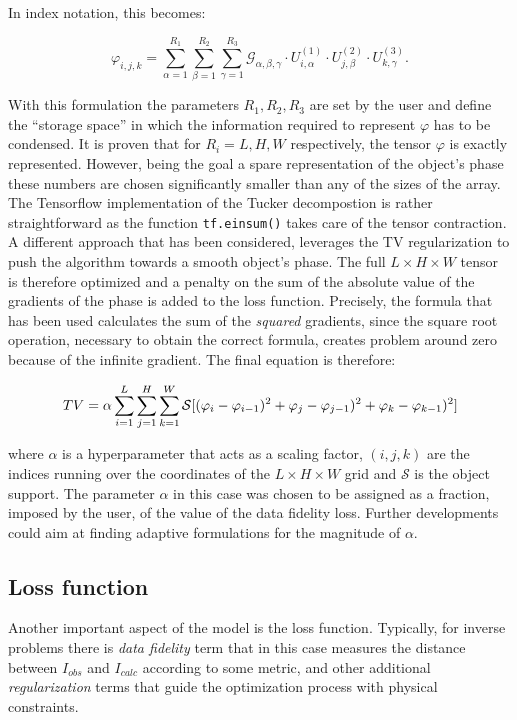 In index notation, this becomes:

\[
\mathcal{\varphi}_{i,j,k} = \sum_{\alpha=1}^{R_1} \sum_{\beta=1}^{R_2} \sum_{\gamma=1}^{R_3}
\mathcal{G}_{\alpha,\beta,\gamma} \cdot U^{(1)}_{i,\alpha} \cdot U^{(2)}_{j,\beta} \cdot U^{(3)}_{k,\gamma}.
\]

With this formulation the parameters $R_1, R_2, R_3$ are set by the user and define the ``storage space'' in which the 
information required to represent $\varphi$ has to be condensed. It is proven that for $R_i = L,H,W$ respectively, the 
tensor $\varphi$ is exactly represented. However, being the goal a spare representation of the object's phase these numbers 
are chosen significantly smaller than any of the sizes of the array. The Tensorflow implementation of the Tucker decompostion 
is rather straightforward as the function \texttt{tf.einsum()} takes care of the tensor contraction.\\

A different approach that has been considered, leverages the TV regularization to push the algorithm towards a smooth object's 
phase. The full $L\times H\times W$ tensor is therefore optimized and a penalty on the sum of the absolute value of the 
gradients of the phase is added to the loss function. Precisely, the formula that has been used calculates the sum of the 
\textit{squared} gradients, since the square root operation, necessary to obtain the correct formula, creates 
problem around zero because of the infinite gradient. The final equation is therefore: 

\begin{equation}
\centering
   TV =  \alpha \sum_{i = 1}^{L}\sum_{j = 1}^{H}\sum_{k = 1}^{W} \mathcal S[(\varphi_{i} - \varphi_{i-1})^2 + \varphi_{j} - \varphi_{j-1})^2 +  \varphi_{k} - \varphi_{k-1})^2]
\end{equation}

where $\alpha $ is a hyperparameter that acts as a scaling factor, $(i,j,k)$ are the indices running over the coordinates of
the $L\times H\times W$ grid and $\mathcal S$ is the object support. The parameter $\alpha $ in this case was chosen to be assigned as a fraction, imposed by the user, 
of the value of the data fidelity loss. Further developments could aim at finding adaptive formulations for the magnitude 
of $\alpha $. 

\subsection{Loss function}
Another important aspect of the model is the loss function. Typically, for inverse problems there is \textit{data fidelity}
term that in this case measures the distance between $I_{obs}$ and $ I_{calc}$ according to some metric, and other additional 
\textit{regularization} terms that guide the optimization process with physical constraints. 

